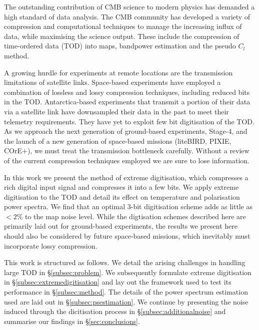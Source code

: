 \documentclass[apj]{emulateapj}
\begin{document}
The outstanding contribution of CMB science to modern physics has demanded a high standard of data analysis. The CMB community has developed a variety of compression and computational techniques to manage the increasing influx of data, while maximising the science output. These include the compression of time-ordered data (TOD) into maps, bandpower estimation and the pseudo $C_l$ method.

A growing hurdle for experiments at remote locations are the transmission limitations of satellite links. Space-based experiments have employed a combination of lossless and lossy compression techniques, including reduced bits in the TOD. Antarctica-based experiments that transmit a portion of their data via a satellite link have downsampled their data in the past to meet their telemetry requirements. They have yet to exploit few bit digitisation of the TOD. As we approach the next generation of ground-based experiments, Stage-4, and the launch of a new generation of space-based missions (liteBIRD, PIXIE, COrE+), we must treat the transmission bottleneck carefully. Without a review of the current compression techniques employed we are sure to lose information.

In this work we present the method of extreme digitisation, which compresses a rich digital input signal and compresses it into a few bits. We apply extreme digitisation to the TOD and detail its effect on temperature and polarisation power spectra. We find that an optimal 3-bit digitisation scheme adds as little as $< 2\%$ to the map noise level. While the digtisation schemes described here are primarily laid out for ground-based experiments, the results we present here should also be considered by future space-based missions, which inevitably must incorporate lossy compression.

This work is structured as follows. We detail the arising challenges in handling large TOD in \S\ref{subsec:problem}. We subsequently formulate extreme digitisation in \S\ref{subsec:extremedigitisation} and lay out the framework used to test its performance in \S\ref{subsec:method}. The details of the power spectrum estimation used are laid out in \S\ref{subsec:psestimation}. We continue by presenting the noise induced through the dicitisation process in \S\ref{subsec:additionalnoise} and summarise our findings in \S\ref{sec:conclusions}. 

\end{document}
